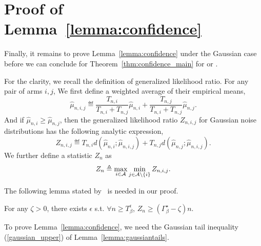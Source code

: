 \section{Proof of Lemma~\ref{lemma:confidence}}\label{app:t3c.confidence}

Finally, it remains to prove Lemma~\ref{lemma:confidence} under the Gaussian case before we can conclude for Theorem~\ref{thm:confidence_main} for \TTTS or \TCC.

\restatefixedconfidence*

For the clarity, we recall the definition of generalized likelihood ratio. For any pair of arms $i, j$, We first define a weighted average of their empirical means,
\[
    \hat{\mu}_{n,i,j} \eqdef \frac{T_{n,i}}{T_{n,i}+T_{n,j}} \hat{\mu}_{n,i} + \frac{T_{n,j}}{T_{n,i}+T_{n,j}} \hat{\mu}_{n,j}.
\]
And if $\hat{\mu}_{n,i}\geq\hat{\mu}_{n,j}$, then the generalized likelihood ratio $Z_{n,i,j}$ for Gaussian noise distributions has the following analytic expression,
\[
    Z_{n,i,j} \eqdef T_{n,i}d(\hat{\mu}_{n,i};\hat{\mu}_{n,i,j}) + T_{n,j}d(\hat{\mu}_{n,j};\hat{\mu}_{n,i,j}).
\]
We further define a statistic $Z_n$ as
\[
    Z_n \triangleq \max_{i\in\mathcal{A}}\min_{j\in\mathcal{A}\backslash\left\{i\right\}} Z_{n,i,j}.
\]

The following lemma stated by~\citet{qin2017ttei} is needed in our proof.

\begin{lemma}\label{lemma:ttei}
\begin{leftbar}[lemmabar]
    For any $\zeta > 0$, there exists $\epsilon$ s.t. $\forall n\geq T_{\beta}^\epsilon$, $Z_n\geq (\Gamma_{\beta}^\star-\zeta)n$.
\end{leftbar}
\end{lemma}

To prove Lemma~\ref{lemma:confidence}, we need the Gaussian tail inequality (\ref{gaussian_upper}) of Lemma~\ref{lemma:gaussiantails}.

